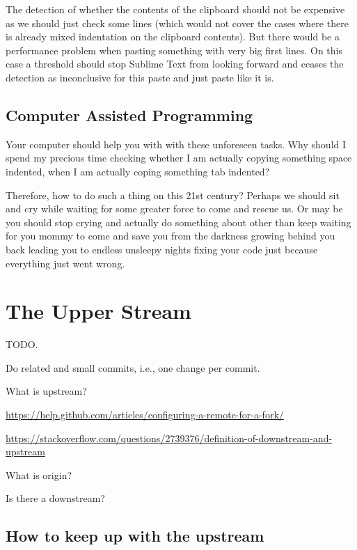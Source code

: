 \begin{englishtext}
    The detection of whether the contents of the clipboard should not be
    expensive as we should just check some lines (which would not cover the
    cases where there is already mixed indentation on the clipboard contents).
    But there would be a performance problem when pasting something with very
    big first lines. On this case a threshold should stop Sublime Text from
    looking forward and ceases the detection as inconclusive for this paste and
    just paste like it is.



    \subsection{Computer Assisted Programming}

    Your computer should help you with with these unforeseen tasks. Why should I
    spend my precious time checking whether I am actually copying something
    space indented, when I am actually coping something tab indented?

    Therefore, how to do such a thing on this 21\q{}st century? Perhaps we
    should sit and cry while waiting for some greater force to come and rescue
    us. Or may be you should stop crying and actually do something about other
    than keep waiting for you mommy to come and save you from the darkness
    growing behind you back leading you to endless unsleepy nights fixing your
    code just because everything just went wrong.



    \section{The Upper Stream}

    TODO.

    Do related and small commits, i.e., one change per commit.

    What is upstream?

    \url{https://help.github.com/articles/configuring-a-remote-for-a-fork/}

    \url{https://stackoverflow.com/questions/2739376/definition-of-downstream-and-upstream}

    What is origin?

    Is there a downstream?



    \subsection{How to keep up with the upstream}


\end{englishtext}
